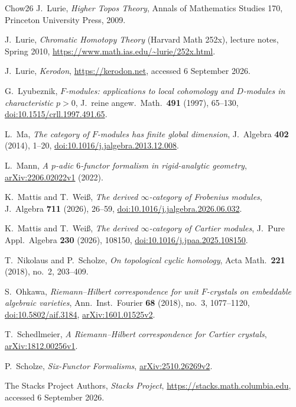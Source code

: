 \documentclass[11pt]{amsart}
\theoremstyle{plain}
\theoremstyle{definition}
\numberwithin{equation}{section}
\begin{document}
\begin{thebibliography}{Chow26}
J.~Lurie, \emph{Higher Topos Theory}, Annals of Mathematics Studies 170, Princeton University Press, 2009.

J.~Lurie, \emph{Chromatic Homotopy Theory} (Harvard Math 252x), lecture notes, Spring 2010,
\url{https://www.math.ias.edu/~lurie/252x.html}.

J.~Lurie, \emph{Kerodon}, \url{https://kerodon.net}, accessed 6 September 2026.

G.~Lyubeznik, \emph{$F$-modules: applications to local cohomology and $D$-modules in characteristic $p>0$},
J.\ reine angew.\ Math.\ \textbf{491} (1997), 65--130,
\href{https://doi.org/10.1515/crll.1997.491.65}{doi:10.1515/crll.1997.491.65}.

L.~Ma, \emph{The category of $F$-modules has finite global dimension},
J.\ Algebra \textbf{402} (2014), 1--20,
\href{https://doi.org/10.1016/j.jalgebra.2013.12.008}{doi:10.1016/j.jalgebra.2013.12.008}.

L.~Mann, \emph{A $p$-adic $6$-functor formalism in rigid-analytic geometry}, \href{https://arxiv.org/abs/2206.02022v1}{arXiv:2206.02022v1} (2022).

K.~Mattis and T.~Wei\ss, \emph{The derived $\infty$-category of Frobenius modules}, J.\ Algebra \textbf{711} (2026), 26--59, \href{https://doi.org/10.1016/j.jalgebra.2026.06.032}{doi:10.1016/j.jalgebra.2026.06.032}.

K.~Mattis and T.~Wei\ss, \emph{The derived $\infty$-category of Cartier modules}, J.\ Pure Appl.\ Algebra \textbf{230} (2026), 108150, \href{https://doi.org/10.1016/j.jpaa.2025.108150}{doi:10.1016/j.jpaa.2025.108150}.

T.~Nikolaus and P.~Scholze, \emph{On topological cyclic homology}, Acta Math.\ \textbf{221} (2018), no.~2, 203--409.

S.~Ohkawa, \emph{Riemann--Hilbert correspondence for unit $F$-crystals on embeddable algebraic varieties},
Ann.\ Inst.\ Fourier \textbf{68} (2018), no.~3, 1077--1120,
\href{https://doi.org/10.5802/aif.3184}{doi:10.5802/aif.3184},
\href{https://arxiv.org/abs/1601.01525v2}{arXiv:1601.01525v2}.

T.~Schedlmeier, \emph{A Riemann--Hilbert correspondence for Cartier crystals},
\href{https://arxiv.org/abs/1812.00256v1}{arXiv:1812.00256v1}.

P.~Scholze, \emph{Six-Functor Formalisms}, \href{https://arxiv.org/abs/2510.26269v2}{arXiv:2510.26269v2}.

The Stacks Project Authors, \emph{Stacks Project}, \url{https://stacks.math.columbia.edu}, accessed 6 September 2026.

\end{thebibliography}
\end{document}
